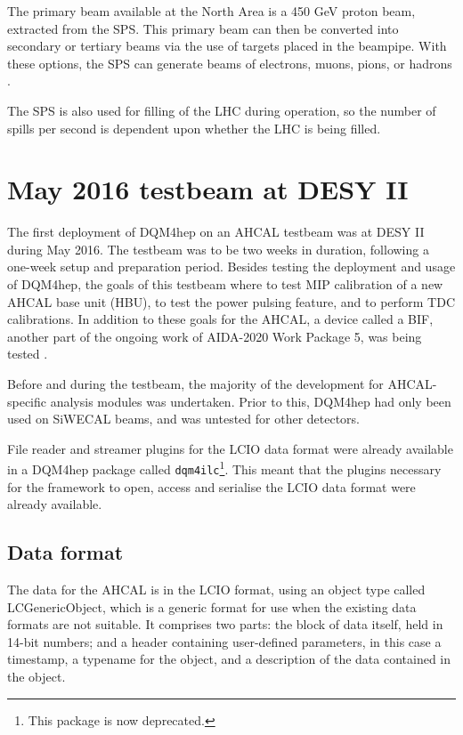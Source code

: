 The primary beam available at the North Area is a 450 GeV proton beam, extracted from the \acrshort{SPS}. This primary beam can then be converted into secondary or tertiary beams via the use of targets placed in the beampipe. With these options, the \acrshort{SPS} can generate beams of electrons, muons, pions, or hadrons \cite{testbeams-sps-h6} \cite{testbeams-sps-h8}. 

The \acrshort{SPS} is also used for filling of the \acrlong{LHC} during operation, so the number of spills per second is dependent upon whether the \acrshort{LHC} is being filled.

\section{May 2016 testbeam at DESY II} %
The first deployment of \acrshort{DQM4hep} on an \acrshort{AHCAL} testbeam was at DESY II during May 2016. The testbeam was to be two weeks in duration, following a one-week setup and preparation period. Besides testing the deployment and usage of DQM4hep, the goals of this testbeam where to test \acrshort{MIP} calibration of a new \acrshort{AHCAL} base unit (HBU), to test the power pulsing feature, and to perform \acrshort{TDC} calibrations. In addition to these goals for the \acrshort{AHCAL}, a device called a \acrfull{BIF}, another part of the ongoing work of \acrshort{AIDA}-2020 Work Package 5, was being tested \cite{beam-interface}.

Before and during the testbeam, the majority of the development for AHCAL-specific analysis modules was undertaken. Prior to this, \acrshort{DQM4hep} had only been used on \acrshort{SiWECAL} beams, and was untested for other detectors. 

File reader and streamer plugins for the \acrshort{LCIO} data format were already available in a DQM4hep package called \texttt{dqm4ilc}\footnote{This package is now deprecated.}. This meant that the plugins necessary for the framework to open, access and serialise the \acrshort{LCIO} data format were already available. 

\subsection{Data format}
The data for the \acrshort{AHCAL} is in the \acrfull{LCIO} format, using an object type called LCGenericObject, which is a generic format for use when the existing data formats are not suitable. It comprises two parts: the block of data itself, held in 14-bit numbers; and a header containing user-defined parameters, in this case a timestamp, a typename for the object, and a description of the data contained in the object.

